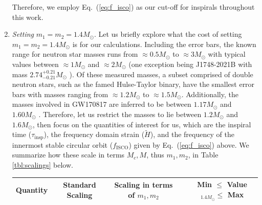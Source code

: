 \documentclass[prd,amsmath,amssymb,aps,floats,amsfonts,notitlepage,superscriptaddress,eqsecnum,nofootinbib,10pt]{revtex4-1}
\newcommand\T{\rule{0pt}{2.6ex}}       %
\newcommand\B{\rule[-1.2ex]{0pt}{0pt}} %
\begin{document}
\begin{enumerate}
Therefore, we employ Eq.~(\ref{eq:f_isco}) as our cut-off for
inspirals throughout this work.
%
\item {\it Setting} $m_1=m_2=1.4 M_\odot$.
Let us briefly explore what the cost of setting $m_1=m_2=1.4 M_\odot$ is for our calculations. 
Including the error bars, the known range for neutron star masses runs from $\approx 0.5 M_\odot$ to $ \approx 3 M_\odot$ with typical values between $\approx 1 M_\odot$ and $\approx 2 M_\odot$ \cite{Ozel_Freire} (one exception being J1748-2021B with mass $2.74^{+0.21}_{-0.21} M_\odot $ \cite{Freire_et_al_2007}).
Of these measured masses, a subset comprised of double neutron stars, such as the famed Hulse-Taylor binary, have the smallest error bars with masses
ranging from $\approx 1.2 M_\odot$ to $\approx 1.5 M_\odot$. 
Additionally, the masses involved in GW170817 are inferred to be between $1.17 M_\odot$ and $1.60 M_\odot$ \cite{GW170817}.
Therefore, let us restrict the masses to lie between $1.2 M_\odot$ and $1.6 M_\odot$, then focus on %
the quantities of interest for us, which are %
the inspiral time ($\tau_\text{insp}$), the frequency domain strain ($\tilde{H}$), and
the frequency of the innermost stable circular orbit ($f_\text{ISCO}$) given by Eq.~(\ref{eq:f_isco}) above.
We summarize how these scale in terms $M_c, M$, thus $m_1, m_2$, in Table \ref{tbl:scalings} below.
%
\begin{center}
\begin{table}[ht]
\begin{tabular}{|l|cccc|}
\hline
 Quantity & Standard Scaling & \hspace{3mm}Scaling in terms of $m_1,m_2$ & &\hspace{0.5cm} Min $\le$ Value$_{1.4M_\odot} \le$ Max\T\B\\
\hline

\end{tabular}
\end{table}
\end{center}
\end{enumerate}
\end{document}
